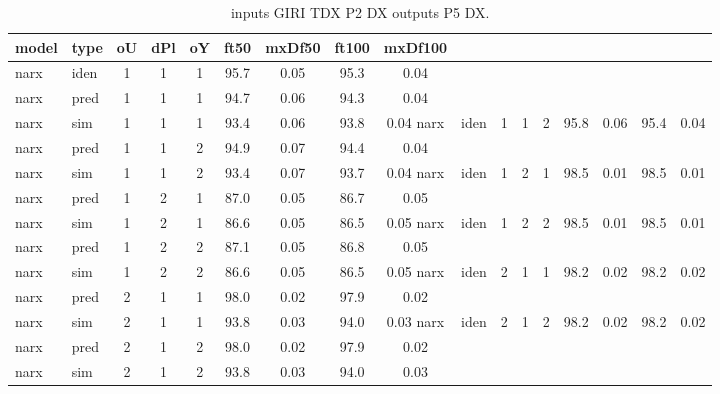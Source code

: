 \begin{center} 
\begin{longtable}{ll|ccc|cc|cc} 
\caption[inputs GIRI TDX P2 DX   outputs P5 DX]{inputs GIRI TDX P2 DX   outputs P5 DX.} 
\label{tab:inputs_GIRI_TDX_P2_DX___outputs_P5_DX} 
\hline 
  model & type & oU & dPl & oY & ft50 & mxDf50 & ft100 & mxDf100 \\ 
 \hline 
narx & iden & 1 & 1 & 1 & 95.7 & 0.05 & 95.3 & 0.04 \\ 
narx & pred & 1 & 1 & 1 & 94.7 & 0.06 & 94.3 & 0.04 \\ 
narx & sim  & 1 & 1 & 1 & 93.4 & 0.06 & 93.8 & 0.04 
 \hline 
narx & iden & 1 & 1 & 2 & 95.8 & 0.06 & 95.4 & 0.04 \\ 
narx & pred & 1 & 1 & 2 & 94.9 & 0.07 & 94.4 & 0.04 \\ 
narx & sim  & 1 & 1 & 2 & 93.4 & 0.07 & 93.7 & 0.04 
 \hline 
narx & iden & 1 & 2 & 1 & 98.5 & 0.01 & 98.5 & 0.01 \\ 
narx & pred & 1 & 2 & 1 & 87.0 & 0.05 & 86.7 & 0.05 \\ 
narx & sim  & 1 & 2 & 1 & 86.6 & 0.05 & 86.5 & 0.05 
 \hline 
narx & iden & 1 & 2 & 2 & 98.5 & 0.01 & 98.5 & 0.01 \\ 
narx & pred & 1 & 2 & 2 & 87.1 & 0.05 & 86.8 & 0.05 \\ 
narx & sim  & 1 & 2 & 2 & 86.6 & 0.05 & 86.5 & 0.05 
 \hline 
narx & iden & 2 & 1 & 1 & 98.2 & 0.02 & 98.2 & 0.02 \\ 
narx & pred & 2 & 1 & 1 & 98.0 & 0.02 & 97.9 & 0.02 \\ 
narx & sim  & 2 & 1 & 1 & 93.8 & 0.03 & 94.0 & 0.03 
 \hline 
narx & iden & 2 & 1 & 2 & 98.2 & 0.02 & 98.2 & 0.02 \\ 
narx & pred & 2 & 1 & 2 & 98.0 & 0.02 & 97.9 & 0.02 \\ 
narx & sim  & 2 & 1 & 2 & 93.8 & 0.03 & 94.0 & 0.03 
 \hline 
\end{longtable} 
\end{center}